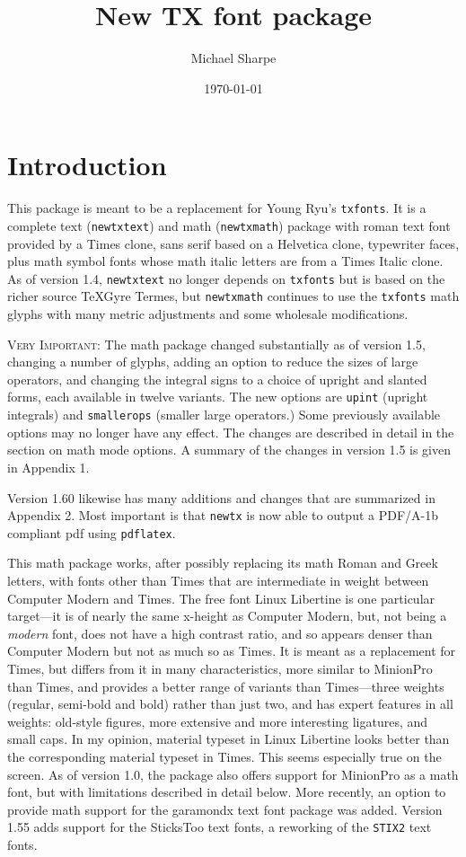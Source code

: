 \documentclass[11pt]{article}
\title{New TX font package}
\author{Michael Sharpe}
\date{\today}  %
\theoremstyle{oldplain}
\theoremstyle{plain}
\begin{document}
\maketitle
\section{Introduction}
This package is meant to be a replacement for Young Ryu's {\tt txfonts}. It is  a complete text ({\tt newtxtext}) and math ({\tt newtxmath}) package with roman text font provided by  a Times clone, sans serif based on a \textsf{Helvetica} clone, typewriter faces, plus math symbol fonts whose math italic letters are from a Times Italic clone. As of version 1.4, {\tt newtxtext} no longer depends on {\tt txfonts} but is based on the richer source \textsf{TeXGyre Termes}, but {\tt newtxmath} continues to use the {\tt txfonts} math glyphs with many metric adjustments and some wholesale modifications.

\textsc{Very Important:} The math package changed substantially as of version 1.5, changing a number of glyphs, adding an option to reduce the sizes of large operators, and changing the integral signs to a choice of upright and slanted forms, each available in twelve variants. The new options are {\tt upint} (upright integrals) and {\tt smallerops} (smaller large operators.) Some previously available options may no longer have any effect. The changes are described in detail in the section on math mode options. A summary of the changes in version 1.5 is given in  Appendix 1. 

Version 1.60 likewise has many additions and changes that are summarized in Appendix 2. Most important is that {\tt newtx} is now able to output a PDF/A-1b compliant pdf using {\tt pdflatex}.



This math package works, after possibly replacing its math Roman and Greek letters, with fonts other than Times that are intermediate in weight between Computer Modern and Times. The free font Linux Libertine is one particular target---it is of nearly the same x-height as Computer Modern, but, not being a \emph{modern} font, does not have a high contrast ratio, and so appears  denser than Computer Modern but not as much so as Times. It is meant as a replacement for Times, but  differs from it in many characteristics, more similar to MinionPro than Times, and provides a better range of variants than Times---three weights (regular, semi-bold and bold) rather than just two, and has expert features in all weights: old-style figures, more extensive and more interesting ligatures,  and  small caps. In my opinion, material typeset in Linux Libertine looks better than the corresponding material typeset in Times. This seems especially true on the screen. As of version 1.0, the package also offers support for MinionPro as a math font, but with limitations described in detail below. More recently, an option to provide math support for the \textsf{garamondx} text font package was added. Version 1.55 adds support for the {SticksToo} text fonts, a reworking of the {\tt STIX2} text fonts.
\end{document}
